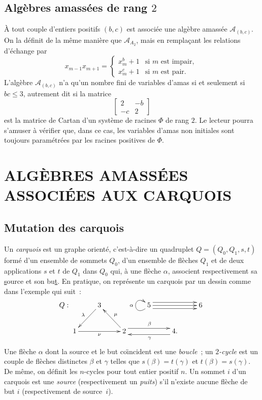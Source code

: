 \documentclass[brochure,12pt]{bourbaki}
\numberwithin{equation}{subsection}
\numberwithin{theorem}{section}
\newcommand{\ca}{{\mathcal A}}
\begin{document}
\subsection{Alg\`ebres amass\'ees de rang $2$} \`A tout couple d'entiers
positifs $(b,c)$ est associ\'ee  une alg\`ebre amass\'ee $\ca_{(b,c)}$. On la
d\'efinit de la m\^eme mani\`ere que $\ca_{A_2}$, mais en rempla\c{c}ant les relations d'\'echange par
\[
x_{m-1} x_{m+1} = \left\{ \begin{array}{ll} x_m^b +1 & \mbox{si $m$ est impair, } \\
                                            x_m^c +1 & \mbox{si $m$ est pair.} \end{array} \right.
\]
L'alg\`ebre $\ca_{(b,c)}$ n'a qu'un nombre fini de variables d'amas
si et seulement si $bc\leq 3$, autrement dit si la matrice
\[
\left[ \begin{array}{cc} 2 & -b \\ -c & 2 \end{array} \right]
\]
est la matrice de Cartan d'un syst\`eme de racines $\Phi$ de rang $2$.
Le lecteur pourra s'amuser \`a v\'erifier que, dans ce cas, les
variables d'amas non initiales sont toujours param\'etr\'ees par
les racines positives de $\Phi$.

\section{ALG\`EBRES AMASS\'EES ASSOCI\'EES AUX CARQUOIS}
\label{s:algebres-amassees-associees-aux-carquois}

\subsection{Mutation des carquois} Un {\em carquois} est un graphe orient\'e, c'est-\`a-dire
un quadruplet $Q=(Q_0, Q_1, s,t)$ form\'e d'un ensemble de sommets $Q_0$, d'un
ensemble de fl\`eches $Q_1$ et de deux applications $s$ et $t$ de $Q_1$ dans $Q_0$
qui, \`a une fl\`eche $\alpha$, associent respectivement sa \underline{s}ource et son
bu\underline{t}. En pratique, on repr\'esente un carquois par un dessin comme dans
l'exemple qui suit~:
\[ Q:
\xymatrix{ & 3 \ar[ld]_\lambda & & 5 \ar@(dl,ul)[]^\alpha \ar@<1ex>[rr] \ar[rr] \ar@<-1ex>[rr] & & 6 \\
  1 \ar[rr]_\nu & & 2 \ar@<1ex>[rr]^\beta \ar[ul]_\mu & & 4.
  \ar@<1ex>[ll]^\gamma }
\]
Une fl\`eche $\alpha$ dont la source
et le but co\"{\i}ncident est une {\em boucle}~;
un {\em $2$-cycle} est un couple de fl\`eches distinctes
$\beta$ et $\gamma$ telles que $s(\beta)=t(\gamma)$ et $t(\beta)=s(\gamma)$.
De m\^eme, on d\'efinit les $n$-cycles pour tout entier positif $n$.
Un sommet $i$ d'un carquois est une {\em source} (respectivement un {\em puits})
s'il n'existe aucune fl\`eche de but $i$ (respectivement de source~$i$).
\end{document}
